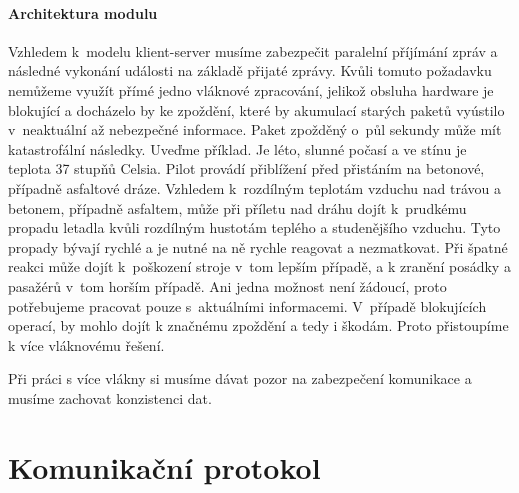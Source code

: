 		\paragraph{Architektura modulu}
		Vzhledem k~modelu klient-server musíme zabezpečit paralelní příjímání zpráv a následné vykonání události na základě přijaté zprávy. Kvůli tomuto požadavku nemůžeme využít přímé jedno vláknové zpracování, jelikož obsluha hardware je blokující a docházelo by ke zpoždění, které by akumulací starých paketů vyústilo v~neaktuální až nebezpečné informace. Paket zpožděný o~půl sekundy může mít katastrofální následky. Uveďme příklad. Je léto, slunné počasí a ve stínu je teplota 37 stupňů Celsia. Pilot provádí přiblížení před přistáním na betonové, případně asfaltové dráze. Vzhledem k~rozdílným teplotám vzduchu nad trávou a betonem, případně asfaltem, může při příletu nad dráhu dojít k~prudkému propadu letadla kvůli rozdílným hustotám teplého a studenějšího vzduchu. Tyto propady bývají rychlé a je nutné na ně rychle reagovat a nezmatkovat. Při špatné reakci může dojít k~poškození stroje v~tom lepším případě, a k zranění posádky a pasažérů v~tom horším případě. Ani jedna možnost není žádoucí, proto potřebujeme pracovat pouze s~aktuálními informacemi. V~případě blokujících operací, by mohlo dojít k značnému zpoždění a tedy i škodám. Proto přistoupíme k více vláknovému řešení.\par
		Při práci s více vlákny si musíme dávat pozor na zabezpečení komunikace a musíme zachovat konzistenci dat.
		
	\section{Komunikační protokol}\label{navrhReseni::protokol}	
	
